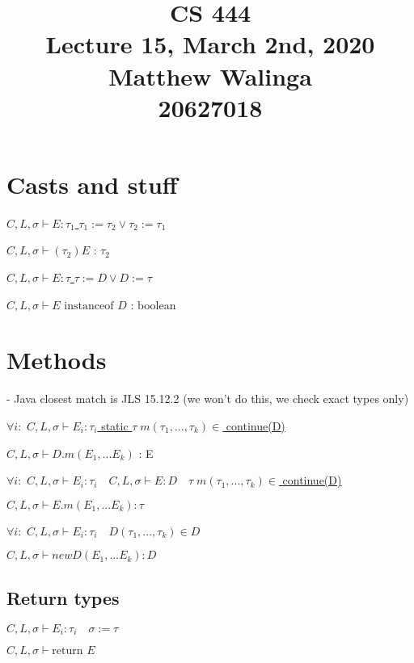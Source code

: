 \documentclass[12pt]{article}
\title{CS 444\\
Lecture 15, March 2nd, 2020 \\
Matthew Walinga\\
20627018}
\begin{document}
\maketitle

\bigskip

\section{Casts and stuff}

\underline{$C,L,\sigma \vdash E : \tau_1 $  $\tau_1 := \tau_2 \vee \tau_2 := \tau_1$}

$C,L,\sigma \vdash (\tau_2) E$ : $\tau_2$
\newline

\underline{$C,L,\sigma \vdash E : \tau $  $\tau := D \vee D := \tau$}

$C,L,\sigma \vdash E \text{ instanceof } D $ : boolean

\section{Methods}

- Java closest match is JLS 15.12.2 (we won't do this, we check exact types only)
\newline

$\forall i:$ \underline{$C,L,\sigma \vdash E_i : \tau_i$  \quad static $\tau \;  m(\tau_1,...,\tau_k) \in $ continue(D)}

$C,L,\sigma \vdash D.m(E_1,...E_k) $ : E
\newline

$\forall i:$  \underline{$C,L,\sigma \vdash E_i : \tau_i \quad C,L,\sigma \vdash E : D \quad \tau \; m(\tau_1,...,\tau_k) \in$ continue(D)}

$C,L,\sigma \vdash E.m(E_1,...E_k) : \tau$ 
\newline

$\forall i:$  \underline{$C,L,\sigma \vdash E_i : \tau_i \quad D(\tau_1,...,\tau_k) \in D$}

$C,L,\sigma \vdash new D(E_1,...E_k) : D$ 
\newline

\subsection{Return types}

\underline{$C,L,\sigma \vdash E_i : \tau_i \quad \sigma := \tau$}

$C,L,\sigma \vdash \text{return } E$ 
\end{document}
